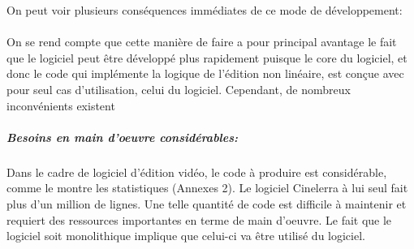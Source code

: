 On peut voir plusieurs conséquences immédiates de ce mode de
développement:


\paragraph{}

On se rend compte que cette manière de faire a pour principal avantage
le fait que le logiciel peut être développé plus rapidement puisque
le core du logiciel, et donc le code qui implémente la logique de
l'édition non linéaire, est conçue avec pour seul cas d'utilisation,
celui du logiciel. Cependant, de nombreux inconvénients existent %

\subparagraph{Besoins en main d'oeuvre considérables:}

\subparagraph { }

Dans le cadre de logiciel d'édition vidéo, le code à produire est
considérable, comme le montre les statistiques (Annexes 2). Le logiciel
Cinelerra à lui seul fait plus d'un million de lignes. Une telle
quantité de code est difficile à maintenir et requiert des ressources
importantes en terme de main d'oeuvre. Le fait que le logiciel soit
monolithique implique que celui-ci va être utilisé
du logiciel.


